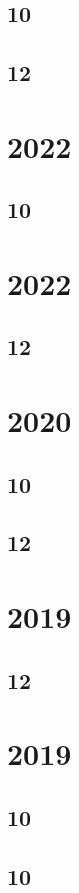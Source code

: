 \documentclass[11pt]{book}
\begin{document}
\subsection{10}

\subsection{12}

\section{2022}
\subsection{10}

\section{2022}
\subsection{12}

\section{2020}
\subsection{10}

\subsection{12}

\section{2019}
\subsection{12}


\section{2019}
\subsection{10}

\subsection{10}

\end{document}

